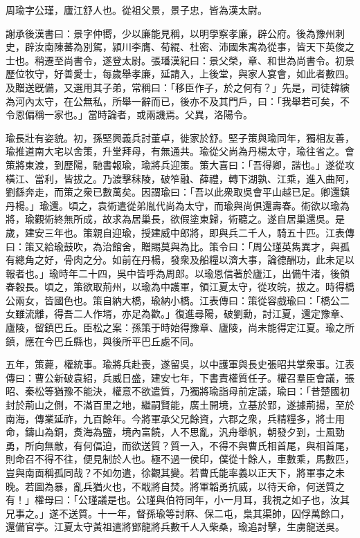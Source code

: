 
\begin{pinyinscope}
周瑜字公瑾，廬江舒人也。從祖父景，景子忠，皆為漢太尉。

謝承後漢書曰：景字仲嚮，少以廉能見稱，以明學察孝廉，辟公府。後為豫州刺史，辟汝南陳蕃為別駕，潁川李膺、荀緄、杜密、沛國朱㝢為從事，皆天下英俊之士也。稍遷至尚書令，遂登太尉。張璠漢紀曰：景父榮，章、和世為尚書令。初景歷位牧守，好善愛士，每歲舉孝廉，延請入，上後堂，與家人宴會，如此者數四。及贈送旣備，又選用其子弟，常稱曰：「移臣作子，於之何有？」先是，司徒韓縯為河內太守，在公無私，所舉一辭而已，後亦不及其門戶，曰：「我舉若可矣，不令恩偏稱一家也。」當時論者，或兩譏焉。父異，洛陽令。

瑜長壯有姿貌。初，孫堅興義兵討董卓，徙家於舒。堅子策與瑜同年，獨相友善，瑜推道南大宅以舍策，升堂拜母，有無通共。瑜從父尚為丹楊太守，瑜往省之。會策將東渡，到歷陽，馳書報瑜，瑜將兵迎策。策大喜曰：「吾得卿，諧也。」遂從攻橫江、當利，皆拔之。乃渡擊秣陵，破笮融、薛禮，轉下湖孰、江乘，進入曲阿，劉繇奔走，而策之衆已數萬矣。因謂瑜曰：「吾以此衆取吳會平山越已足。卿還鎮丹楊。」瑜還。頃之，袁術遣從弟胤代尚為太守，而瑜與尚俱還壽春。術欲以瑜為將，瑜觀術終無所成，故求為居巢長，欲假塗東歸，術聽之。遂自居巢還吳。是歲，建安三年也。策親自迎瑜，授建威中郎將，即與兵二千人，騎五十匹。江表傳曰：策又給瑜鼓吹，為治館舍，贈賜莫與為比。策令曰：「周公瑾英雋異才，與孤有總角之好，骨肉之分。如前在丹楊，發衆及船糧以濟大事，論德酬功，此未足以報者也。」瑜時年二十四，吳中皆呼為周郎。以瑜恩信著於廬江，出備牛渚，後領春穀長。頃之，策欲取荊州，以瑜為中護軍，領江夏太守，從攻皖，拔之。時得橋公兩女，皆國色也。策自納大橋，瑜納小橋。江表傳曰：策從容戲瑜曰：「橋公二女雖流離，得吾二人作壻，亦足為歡。」復進尋陽，破劉勳，討江夏，還定豫章、廬陵，留鎮巴丘。臣松之案：孫策于時始得豫章、廬陵，尚未能得定江夏。瑜之所鎮，應在今巴丘縣也，與後所平巴丘處不同。

五年，策薨，權統事。瑜將兵赴喪，遂留吳，以中護軍與長史張昭共掌衆事。江表傳曰：曹公新破袁紹，兵威日盛，建安七年，下書責權質任子。權召羣臣會議，張昭、秦松等猶豫不能決，權意不欲遣質，乃獨將瑜詣母前定議，瑜曰：「昔楚國初封於荊山之側，不滿百里之地，繼嗣賢能，廣土開境，立基於郢，遂據荊揚，至於南海，傳業延祚，九百餘年。今將軍承父兄餘資，六郡之衆，兵精糧多，將士用命，鑄山為銅，煑海為鹽，境內富饒，人不思亂，汎舟舉帆，朝發夕到，士風勁勇，所向無敵，有何偪迫，而欲送質？質一入，不得不與曹氏相首尾，與相首尾，則命召不得不往，便見制於人也。極不過一侯印，僕從十餘人，車數乘，馬數匹，豈與南靣稱孤同哉？不如勿遣，徐觀其變。若曹氏能率義以正天下，將軍事之未晚。若圖為暴，亂兵猶火也，不戢將自焚。將軍韜勇抗威，以待天命，何送質之有！」權母曰：「公瑾議是也。公瑾與伯符同年，小一月耳，我視之如子也，汝其兄事之。」遂不送質。十一年，督孫瑜等討麻、保二屯，梟其渠帥，囚俘萬餘口，還備官亭。江夏太守黃祖遣將鄧龍將兵數千人入柴桑，瑜追討擊，生虜龍送吳。


\end{pinyinscope}
